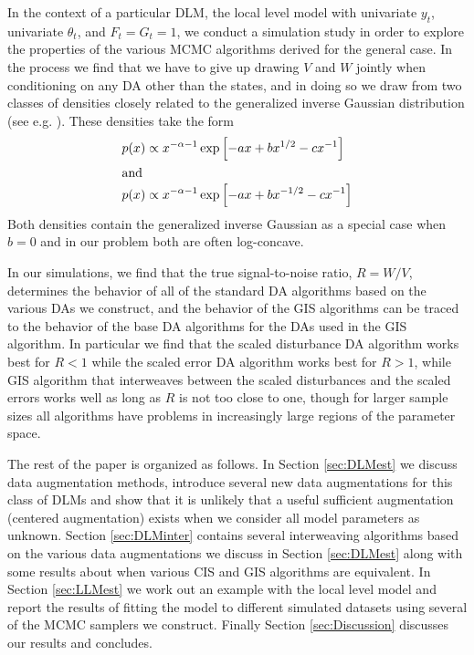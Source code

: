 \documentclass{article}
\begin{document}
In the context of a particular DLM, the local level model with univariate $y_t$, univariate $\theta_t$, and $F_t=G_t=1$, we conduct a simulation study in order to explore the properties of the various MCMC algorithms derived for the general case. In the process we find that we have to give up drawing $V$ and $W$ jointly when conditioning on any DA other than the states, and in doing so we draw from two classes of densities closely related to the generalized inverse Gaussian distribution (see e.g. \citet{jorgensen1982statistical}). These densities take the form
\begin{align*}
  p(x)&\propto x^{-\alpha - 1}\exp\left[-ax + bx^{1/2} - cx^{-1}\right]\\
  \intertext{and}
  p(x)&\propto x^{-\alpha - 1}\exp\left[-ax + bx^{-1/2} - cx^{-1}\right]
\end{align*}
Both densities contain the generalized inverse Gaussian as a special case when $b=0$ and in our problem both are often log-concave. 

In our simulations, we find that the true signal-to-noise ratio, $R=W/V$, determines the behavior of all of the standard DA algorithms based on the various DAs we construct, and the behavior of the GIS algorithms can be traced to the behavior of the base DA algorithms for the DAs used in the GIS algorithm. In particular we find that the scaled disturbance DA algorithm works best for $R<1$ while the scaled error DA algorithm works best for $R>1$, while GIS algorithm that interweaves between the scaled disturbances and the scaled errors works well as long as $R$ is not too close to one, though for larger sample sizes all algorithms have problems in increasingly large regions of the parameter space.

The rest of the paper is organized as follows. In Section \ref{sec:DLMest} we discuss data augmentation methods, introduce several new data augmentations for this class of DLMs and show that it is unlikely that a useful sufficient augmentation (centered augmentation) exists when we consider all model parameters as unknown. Section \ref{sec:DLMinter} contains several interweaving algorithms based on the various data augmentations we discuss in Section \ref{sec:DLMest} along with some results about when various CIS and GIS algorithms are equivalent. In Section \ref{sec:LLMest} we work out an example with the local level model and report the results of fitting the model to different simulated datasets using several of the MCMC samplers we construct. Finally Section \ref{sec:Discussion} discusses our results and concludes.
\end{document}
